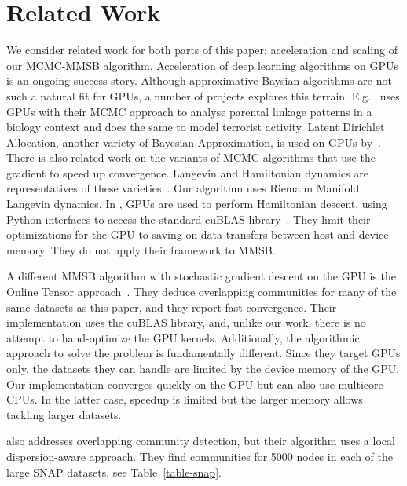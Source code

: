 \section{Related Work}
\label{sec-related}

We consider related work for both parts of this paper: acceleration and scaling
of our MCMC-MMSB algorithm. Acceleration of deep learning algorithms on GPUs
is an ongoing success story. Although approximative Baysian algorithms are
not such a natural fit for GPUs, a number of projects explores this terrain.
E.g.~\cite{journals/bioinformatics/MedlarGSBK13} uses GPUs with their
MCMC approach to analyse parental linkage patterns in a biology context and
\cite{DBLP:journals/csda/WhiteP14} does the same to model terrorist activity.
Latent Dirichlet Allocation, another variety of Bayesian Approximation,
is used on GPUs by~\cite{DBLP:conf/nips/YanXQ09}. There is also related
work on the variants of MCMC algorithms that use the gradient to speed
up convergence. Langevin and Hamiltonian dynamics are representatives of
these varieties~\cite{Girolami_riemannmanifold}. Our algorithm uses Riemann
Manifold Langevin dynamics. In \cite{beam2014fast}, GPUs are used to perform
Hamiltonian descent, using Python interfaces to access the standard cuBLAS
library~\cite{cuBLAS}. They limit their optimizations for the GPU to saving
on data transfers between host and device memory. They do not apply their
framework to MMSB.

A different MMSB algorithm with stochastic gradient descent on the GPU is
the Online Tensor approach~\cite{DBLP:journals/corr/HuangNHVA13}. They deduce
overlapping communities for many of the same datasets as this paper, and they
report fast convergence. Their implementation uses the cuBLAS
library, and, unlike our work, there is no attempt to hand-optimize the GPU
kernels. Additionally, the algorithmic approach to solve the problem is
fundamentally different.
Since they target GPUs only, the datasets they
can handle are limited by the device memory of the GPU. Our implementation converges
quickly on the GPU but can also use multicore CPUs. In the latter case, speedup is
limited but the larger memory allows tackling larger datasets.

\cite{liakos-bigdata16} also addresses overlapping community detection, but their
algorithm uses a local dispersion-aware approach. They find communities for 5000
nodes in each of the large SNAP datasets, see Table~\ref{table-snap}.

